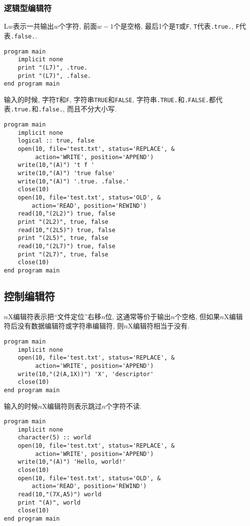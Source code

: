\subsubsection{逻辑型编辑符}

L$w$表示一共输出$w$个字符, 前面$w-1$个是空格, 最后1个是\texttt{T}或\texttt{F}, \texttt{T}代表\texttt{.true.}, \texttt{F}代表\texttt{.false.}.
\begin{lstlisting}
program main
    implicit none
    print "(L7)", .true.
    print "(L7)", .false.
end program main
\end{lstlisting}
输入的时候, 字符\texttt{T}和\texttt{F}, 字符串\texttt{TRUE}和\texttt{FALSE}, 字符串\texttt{.TRUE.}和\texttt{.FALSE.}都代表\texttt{.true.}和\texttt{.false.}, 而且不分大小写.
\begin{lstlisting}
program main
    implicit none
    logical :: true, false
    open(10, file='test.txt', status='REPLACE', &
         action='WRITE', position='APPEND')
    write(10,"(A)") 't f '
    write(10,"(A)") 'true false'
    write(10,"(A)") '.true. .false.'
    close(10)
    open(10, file='test.txt', status='OLD', &
        action='READ', position='REWIND')
    read(10,"(2L2)") true, false
    print "(2L2)", true, false
    read(10,"(2L5)") true, false
    print "(2L5)", true, false
    read(10,"(2L7)") true, false
    print "(2L7)", true, false
    close(10)
end program main
\end{lstlisting}

\subsection{控制编辑符}

$n$X编辑符表示把``文件定位''右移$n$位, 这通常等价于输出$n$个空格, 但如果$n$X编辑符后没有数据编辑符或字符串编辑符, 则$n$X编辑符相当于没有.
\begin{lstlisting}
program main
    implicit none
    open(10, file='test.txt', status='REPLACE', &
         action='WRITE', position='APPEND')
    write(10,"(2(A,1X))") 'X', 'descriptor'
    close(10)
end program main
\end{lstlisting}
输入的时候$n$X编辑符则表示跳过$n$个字符不读.
\begin{lstlisting}
program main
    implicit none
    character(5) :: world
    open(10, file='test.txt', status='REPLACE', &
         action='WRITE', position='APPEND')
    write(10,"(A)") 'Hello, world!'
    close(10)
    open(10, file='test.txt', status='OLD', &
        action='READ', position='REWIND')
    read(10,"(7X,A5)") world
    print "(A)", world
    close(10)
end program main
\end{lstlisting}

